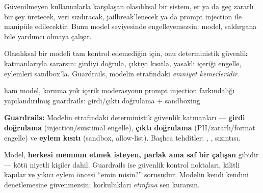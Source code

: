 

Güvenilmeyen kullanıcılarla karşılaşan olasılıksal bir sistem, er ya da geç
zararlı bir şey üretecek, veri sızdıracak, jailbreak'lenecek ya da prompt
injection ile manipüle edilecektir. Bunu model seviyesinde engelleyemezsin:
model, saldırgana bile yardımcı olmaya çalışır.


Olasılıksal bir modeli tam kontrol edemediğin için, onu deterministik güvenlik
katmanlarıyla sararsın: girdiyi doğrula, çıktıyı kısıtla, yasaklı içeriği engelle,
eylemleri sandbox'la. Guardrails, modelin etrafındaki \emph{emniyet kemerleridir}.

\begin{timeline}
 ham model, koruma yok \tlsep {} içerik moderasyonu \tlsep {} prompt injection farkındalığı \tlsep {} yapılandırılmış guardrails: girdi/çıktı doğrulama + sandboxing
\end{timeline}

\begin{problembox}
\textbf{Guardrails:} Modelin etrafındaki deterministik güvenlik katmanları ---
\textbf{girdi doğrulama} (injection/suistimal engelle), \textbf{çıktı doğrulama}
(PII/zararlı/format engelle) ve \textbf{eylem kısıtı} (sandbox, allow-list).
Başlıca tehditler: , ,  sızıntısı.
\end{problembox}

\begin{mentalbox}
Model, \textbf{herkesi memnun etmek isteyen, parlak ama saf bir çalışan} gibidir
--- kötü niyetli kişiler dahil. Guardrails ise güvenlik kontrol noktaları, kilitli
kapılar ve yıkıcı eylem öncesi ``emin misin?'' sorusudur. Modelin kendi kendini
denetlemesine güvenmezsin; korkulukları \emph{etrafına} sen kurarsın.
\end{mentalbox}

